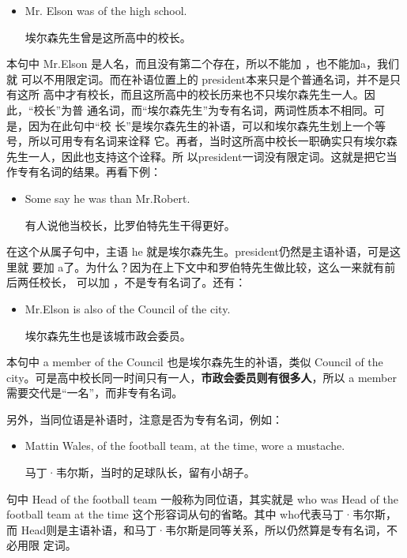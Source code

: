 \begin{itemize}
\item Mr. Elson was  of the high school.

  埃尔森先生曾是这所高中的校长。
\end{itemize}

本句中 Mr.Elson 是人名，而且没有第二个存在，所以不能加 ，也不能加a，我们就
可以不用限定词。而在补语位置上的 president本来只是个普通名词，并不是只有这所
高中才有校长，而且这所高中的校长历来也不只埃尔森先生一人。因此，“校长”为普
通名词，而“埃尔森先生”为专有名词，两词性质本不相同。可是，因为在此句中“校
长”是埃尔森先生的补语，可以和埃尔森先生划上一个等号，所以可用专有名词来诠释
它。再者，当时这所高中校长一职确实只有埃尔森先生一人，因此也支持这个诠释。所
以president一词没有限定词。这就是把它当作专有名词的结果。再看下例：

\begin{itemize}
\item Some say he was  than Mr.Robert.

  有人说他当校长，比罗伯特先生干得更好。
\end{itemize}

在这个从属子句中，主语 he 就是埃尔森先生。president仍然是主语补语，可是这里就
要加 a了。为什么？因为在上下文中和罗伯特先生做比较，这么一来就有前后两任校长，
可以加 ，不是专有名词了。还有：

\begin{itemize}
\item  Mr.Elson is also  of the Council of the city.

  埃尔森先生也是该城市政会委员。
\end{itemize}

本句中 a member of the Council 也是埃尔森先生的补语，类似 Council of the
city。可是高中校长同一时间只有一人，\textbf{市政会委员则有很多人}，所以 a
member需要交代是“一名”，而非专有名词。

另外，当同位语是补语时，注意是否为专有名词，例如：

\begin{itemize}
\item Mattin Wales,  of the football team, at the time, wore a
  mustache.

  马丁·韦尔斯，当时的足球队长，留有小胡子。
\end{itemize}

句中 Head of the football team 一般称为同位语，其实就是 who was Head of the
football team at the time 这个形容词从句的省略。其中 who代表马丁·韦尔斯，
而 Head则是主语补语，和马丁·韦尔斯是同等关系，所以仍然算是专有名词，不必用限
定词。

